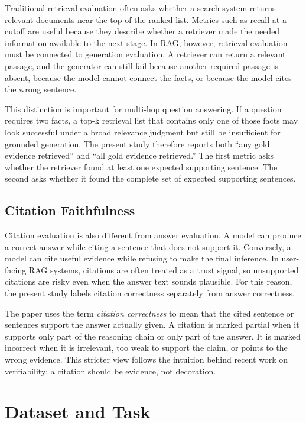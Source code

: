 \documentclass[10pt,twocolumn]{article}
\begin{document}
Traditional retrieval evaluation often asks whether a search system returns relevant documents near the top of the ranked list. Metrics such as recall at a cutoff are useful because they describe whether a retriever made the needed information available to the next stage. In RAG, however, retrieval evaluation must be connected to generation evaluation. A retriever can return a relevant passage, and the generator can still fail because another required passage is absent, because the model cannot connect the facts, or because the model cites the wrong sentence.

This distinction is important for multi-hop question answering. If a question requires two facts, a top-k retrieval list that contains only one of those facts may look successful under a broad relevance judgment but still be insufficient for grounded generation. The present study therefore reports both ``any gold evidence retrieved'' and ``all gold evidence retrieved.'' The first metric asks whether the retriever found at least one expected supporting sentence. The second asks whether it found the complete set of expected supporting sentences.

\subsection{Citation Faithfulness}

Citation evaluation is also different from answer evaluation. A model can produce a correct answer while citing a sentence that does not support it. Conversely, a model can cite useful evidence while refusing to make the final inference. In user-facing RAG systems, citations are often treated as a trust signal, so unsupported citations are risky even when the answer text sounds plausible. For this reason, the present study labels citation correctness separately from answer correctness.

The paper uses the term \emph{citation correctness} to mean that the cited sentence or sentences support the answer actually given. A citation is marked partial when it supports only part of the reasoning chain or only part of the answer. It is marked incorrect when it is irrelevant, too weak to support the claim, or points to the wrong evidence. This stricter view follows the intuition behind recent work on verifiability: a citation should be evidence, not decoration.

\section{Dataset and Task}
\end{document}
